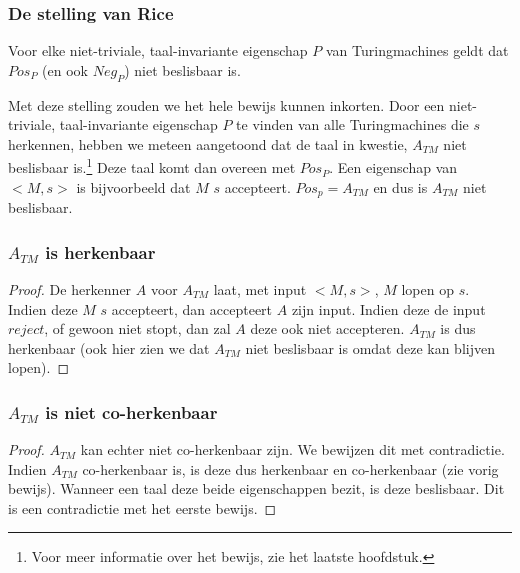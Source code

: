 \subsubsection*{De stelling van Rice}

\begin{theorem}
	Voor elke niet-triviale, taal-invariante eigenschap $P$ van Turingmachines geldt dat $Pos_P$ (en ook $Neg_P$) niet beslisbaar is.
\end{theorem}

Met deze stelling zouden we het hele bewijs kunnen inkorten. Door een niet-triviale, taal-invariante eigenschap $P$ te vinden van alle Turingmachines die $s$ herkennen, hebben we meteen aangetoond dat de taal in kwestie, $A_{TM}$ niet beslisbaar is.\footnote{Voor meer informatie over het bewijs, zie het laatste hoofdstuk.} Deze taal komt dan overeen met $Pos_P$. Een eigenschap van $<M,s>$ is bijvoorbeeld dat $M$ $s$ accepteert. $Pos_p = A_{TM}$ en dus is $A_{TM}$ niet beslisbaar.

\subsubsection*{$A_{TM}$ is herkenbaar}
\begin{proof}
	De herkenner $A$ voor $A_{TM}$ laat, met input $<M,s>$, $M$ lopen op $s$. Indien deze $M$ $s$ accepteert, dan accepteert $A$ zijn input. Indien deze de input $reject$, of gewoon niet stopt, dan zal $A$ deze ook niet accepteren. $A_{TM}$ is dus herkenbaar (ook hier zien we dat $A_{TM}$ niet beslisbaar is omdat deze kan blijven lopen).
\end{proof}

\subsubsection*{$A_{TM}$ is niet co-herkenbaar}
\begin{proof}
	$A_{TM}$ kan echter niet co-herkenbaar zijn. We bewijzen dit met contradictie. Indien $A_{TM}$ co-herkenbaar is, is deze dus herkenbaar en co-herkenbaar (zie vorig bewijs). Wanneer een taal deze beide eigenschappen bezit, is deze beslisbaar. Dit is een contradictie met het eerste bewijs.
\end{proof}
